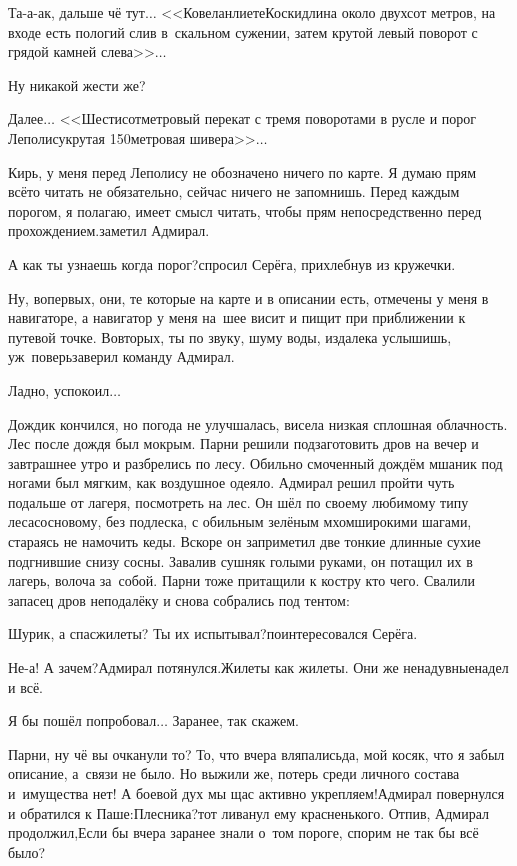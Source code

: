 \diagdash Та-а-ак, дальше чё тут$\ldots$ <<Ковеланлиете\sdash Коски\mdash длина около двухсот метров, на входе есть пологий слив в~скальном сужении, затем крутой левый поворот с грядой камней слева>>$\ldots$

\diagdash Ну никакой жести же?

\diagdash Далее$\ldots$ <<Шестисотметровый перекат с тремя поворотами в русле и порог Леполису\mdash крутая 150\sdash метровая шивера>>$\ldots$

\diagdash Кирь, у меня перед Леполису не обозначено ничего по карте. Я думаю прям всё\sdash то читать не обязательно, сейчас ничего не запомнишь. Перед каждым порогом, я полагаю, имеет смысл читать, чтобы прям непосредственно перед прохождением.\mdash заметил Адмирал.

\diagdash А как ты узнаешь когда порог?\mdash спросил Серёга, прихлебнув из кружечки.

\diagdash Ну, во\sdash первых, они, те которые на карте и в описании есть, отмечены у меня в навигаторе, а навигатор у меня на~шее висит и пищит при приближении к путевой точке. Во\sdash вторых, ты по звуку, шуму воды, издалека услышишь, уж~поверь\mdash заверил команду Адмирал.

\diagdash Ладно, успокоил$\ldots$

Дождик кончился, но погода не улучшалась, висела низкая сплошная облачность. Лес после дождя был мокрым. Парни решили подзаготовить дров на вечер и завтрашнее утро и разбрелись по лесу. Обильно смоченный дождём мшаник под ногами был мягким, как воздушное одеяло. Адмирал решил пройти чуть подальше от лагеря, посмотреть на лес. Он шёл по своему любимому типу леса\mdash сосновому, без подлеска, с обильным зелёным мхом\mdash широкими шагами, стараясь не намочить кеды. Вскоре он заприметил две тонкие длинные сухие подгнившие снизу сосны. Завалив сушняк голыми руками, он потащил их в лагерь, волоча за~собой. Парни тоже притащили к костру кто чего. Свалили запасец дров неподалёку и снова собрались под тентом:

\diagdash Шурик, а спасжилеты? Ты их испытывал?\mdash поинтересовался Серёга.

\diagdash Не-а! А зачем?\mdash Адмирал потянулся.\mdash Жилеты как жилеты. Они же ненадувные\mdash надел и всё.

\diagdash Я бы пошёл попробовал$\ldots$ Заранее, так скажем.

\diagdash Парни, ну чё вы очканули то? То, что вчера вляпались\mdash да, мой косяк, что я забыл описание, а~связи не было. Но выжили же, потерь среди личного состава и~имущества нет! А боевой дух мы щас активно укрепляем!\mdash Адмирал повернулся и обратился к Паше:\mdash Плесни\sdash ка?\mdash тот ливанул ему красненького. Отпив, Адмирал продолжил,\mdash Если бы вчера заранее знали о~том пороге, спорим не так бы всё было?

